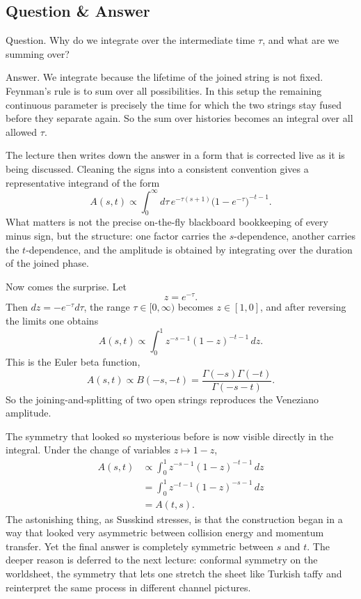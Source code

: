 \subsection{Question \& Answer}

Question. Why do we integrate over the intermediate time \(\tau\), and what are we summing over?

Answer. We integrate because the lifetime of the joined string is not fixed. Feynman's rule is to sum over all possibilities. In this setup the remaining continuous parameter is precisely the time for which the two strings stay fused before they separate again. So the sum over histories becomes an integral over all allowed \(\tau\).

The lecture then writes down the answer in a form that is corrected live as it is being discussed. Cleaning the signs into a consistent convention gives a representative integrand of the form
\begin{equation}
A(s,t)\propto \int_0^\infty d\tau\, e^{-\tau(s+1)}\bigl(1-e^{-\tau}\bigr)^{-t-1}.
\end{equation}
What matters is not the precise on-the-fly blackboard bookkeeping of every minus sign, but the structure: one factor carries the \(s\)-dependence, another carries the \(t\)-dependence, and the amplitude is obtained by integrating over the duration of the joined phase.

Now comes the surprise. Let
\begin{equation}
z=e^{-\tau}.
\end{equation}
Then \(d z = -e^{-\tau}d\tau\), the range \(\tau\in[0,\infty)\) becomes \(z\in[1,0]\), and after reversing the limits one obtains
\begin{equation}
A(s,t)\propto \int_0^1 z^{-s-1}(1-z)^{-t-1}\,dz.
\end{equation}
This is the Euler beta function,
\begin{equation}
A(s,t)\propto B(-s,-t)=\frac{\Gamma(-s)\Gamma(-t)}{\Gamma(-s-t)}.
\end{equation}
So the joining-and-splitting of two open strings reproduces the Veneziano amplitude.

The symmetry that looked so mysterious before is now visible directly in the integral. Under the change of variables \(z\mapsto 1-z\),
\begin{align}
A(s,t)
&\propto \int_0^1 z^{-s-1}(1-z)^{-t-1}\,dz \\
&= \int_0^1 z^{-t-1}(1-z)^{-s-1}\,dz \\
&= A(t,s).
\end{align}
The astonishing thing, as Susskind stresses, is that the construction began in a way that looked very asymmetric between collision energy and momentum transfer. Yet the final answer is completely symmetric between \(s\) and \(t\). The deeper reason is deferred to the next lecture: conformal symmetry on the worldsheet, the symmetry that lets one stretch the sheet like Turkish taffy and reinterpret the same process in different channel pictures.

